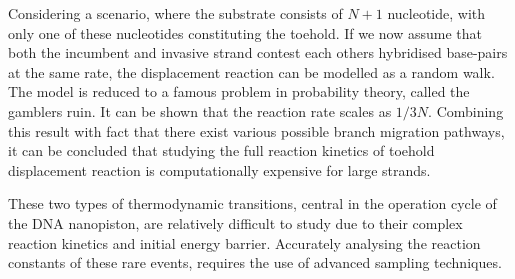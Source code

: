 Considering a scenario, where the substrate consists of $N+1$ nucleotide, with only one
of these nucleotides constituting the toehold. If we now assume that both the incumbent
and invasive strand contest each others hybridised base-pairs at the same rate, the
displacement reaction can be modelled as a random walk. The model is reduced to a famous
problem in probability theory, called the gamblers ruin. It can be shown that the
reaction rate scales as $1/3N$. Combining this result with fact that there exist various
possible branch migration pathways, it can be concluded that studying the full reaction
kinetics of toehold displacement reaction is computationally expensive for large
strands.\cite{Srinivas2013}

These two types of thermodynamic transitions, central in the operation cycle of the DNA
nanopiston, are relatively difficult to study due to their complex reaction kinetics and
initial energy barrier. Accurately analysing the reaction constants of these rare events,
requires the use of advanced sampling techniques.
